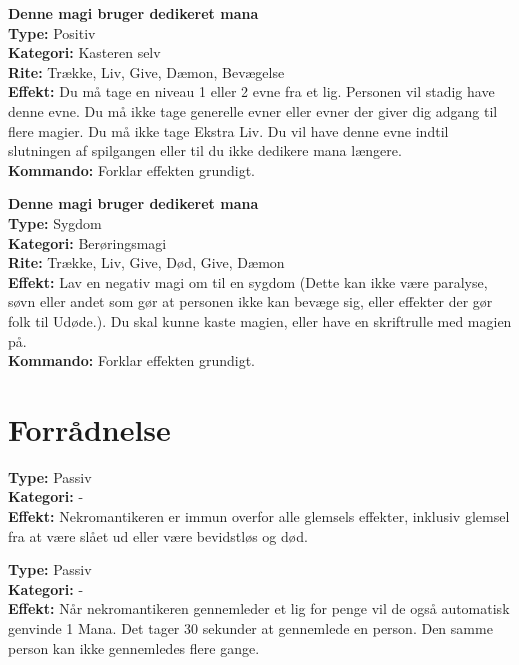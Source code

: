 \begin{nSjæl*}
\textbf{Denne magi bruger dedikeret mana}\\
\textbf{Type:} Positiv\\
\textbf{Kategori:} Kasteren selv\\
\textbf{Rite:} Trække, Liv, Give, Dæmon, Bevægelse\\
\textbf{Effekt:} Du må tage en niveau 1 eller 2 evne fra et lig. Personen vil stadig have denne evne. Du må ikke tage generelle evner eller evner der giver dig adgang til flere magier. Du må ikke tage Ekstra Liv. Du vil have denne evne indtil slutningen af spilgangen eller til du ikke dedikere mana længere.\\
\textbf{Kommando:} Forklar effekten grundigt.\\
\end{nSjæl*}

\begin{nSjæl*}
\textbf{Denne magi bruger dedikeret mana}\\
\textbf{Type:} Sygdom\\
\textbf{Kategori:} Berøringsmagi\\
\textbf{Rite:} Trække, Liv, Give, Død, Give, Dæmon\\
\textbf{Effekt:} Lav en negativ magi om til en sygdom (Dette kan ikke være paralyse, søvn eller andet som gør at personen ikke kan bevæge sig, eller effekter der gør folk til Udøde.). Du skal kunne kaste magien, eller have en skriftrulle med magien på.\\
\textbf{Kommando:} Forklar effekten grundigt.
\end{nSjæl*}

\section{Forrådnelse}

\begin{død*}
\textbf{Type:} Passiv\\
\textbf{Kategori:} -\\
\textbf{Effekt:} Nekromantikeren er immun overfor alle glemsels effekter, inklusiv glemsel fra at være slået ud eller være bevidstløs og død.
\end{død*}

\begin{død*}
\textbf{Type:} Passiv \\
\textbf{Kategori:} -\\
\textbf{Effekt:} Når nekromantikeren gennemleder et lig for penge vil de også automatisk genvinde 1 Mana. Det tager 30 sekunder at gennemlede en person. Den samme person kan ikke gennemledes flere gange.\\
\end{død*}


